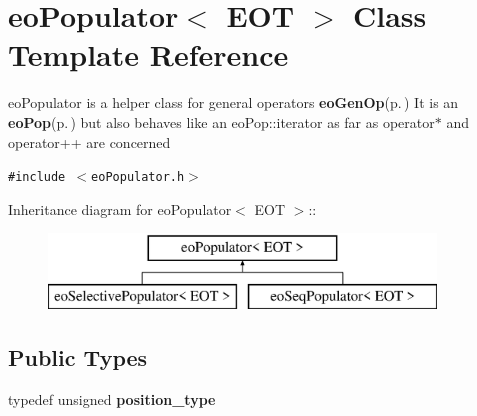 \section{eo\-Populator$<$ EOT $>$ Class Template Reference}
\label{classeo_populator}
eo\-Populator is a helper class for general operators {\bf eo\-Gen\-Op}{\rm (p.\,\pageref{classeo_gen_op})} It is an {\bf eo\-Pop}{\rm (p.\,\pageref{classeo_pop})} but also behaves like an eo\-Pop::iterator as far as operator$\ast$ and operator++ are concerned  


{\tt \#include $<$eo\-Populator.h$>$}

Inheritance diagram for eo\-Populator$<$ EOT $>$::\begin{figure}[H]
\begin{center}
\leavevmode
\includegraphics[height=2cm]{classeo_populator}
\end{center}
\end{figure}
\subsection*{Public Types}
\begin{CompactItemize}
\item 
typedef unsigned {\bf position\_\-type}\label{classeo_populator_w0}

\end{CompactItemize}
